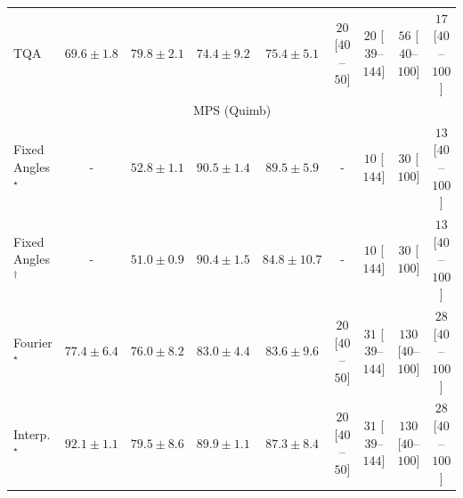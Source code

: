 \begin{tabular}{l|cccc|cccc|}
TQA & {\cellcolor[HTML]{95A8D0}} \color[HTML]{F1F1F1} $69.6\pm 1.8$ & {\cellcolor[HTML]{8A59A8}} \color[HTML]{F1F1F1} $79.8\pm 2.1$ & {\cellcolor[HTML]{8C84BD}} \color[HTML]{F1F1F1} $74.4\pm 9.2$ & {\cellcolor[HTML]{8C7CB9}} \color[HTML]{F1F1F1} $75.4\pm 5.1$ & {\cellcolor[HTML]{FFF4F0}} \color[HTML]{000000} $20$ [$40$--$50$] & {\cellcolor[HTML]{FFF4F0}} \color[HTML]{000000} $20$ [$39$--$144$] & {\cellcolor[HTML]{FEECE9}} \color[HTML]{000000} $56$ [$40$--$100$] & {\cellcolor[HTML]{FFF5F1}} \color[HTML]{000000} $17$ [$40$--$100$] \\
\cline{1-9}
\multicolumn{9}{c}{\rule{0pt}{8pt}MPS (Quimb)} \\
\midrule
Fixed Angles$^\star$ & {\cellcolor[HTML]{000000}} \color[HTML]{F1F1F1} {\cellcolor{white}} \color{black} - & {\cellcolor[HTML]{FFFCD8}} \color[HTML]{000000} $52.8\pm 1.1$ & {\cellcolor[HTML]{812D05}} \color[HTML]{F1F1F1} $90.5\pm 1.4$ & {\cellcolor[HTML]{8B3005}} \color[HTML]{F1F1F1} $89.5\pm 5.9$ & {\cellcolor[HTML]{000000}} \color[HTML]{F1F1F1} {\cellcolor{white}} \color{black} - & {\cellcolor[HTML]{FFF7F3}} \color[HTML]{000000} $10$ [$144$] & {\cellcolor[HTML]{FFF2EE}} \color[HTML]{000000} $30$ [$100$] & {\cellcolor[HTML]{FFF6F2}} \color[HTML]{000000} $13$ [$40$--$100$] \\
Fixed Angles$^\dagger$ & {\cellcolor[HTML]{000000}} \color[HTML]{F1F1F1} {\cellcolor{white}} \color{black} - & {\cellcolor[HTML]{FFFFE5}} \color[HTML]{000000} $51.0\pm 0.9$ & {\cellcolor[HTML]{832D05}} \color[HTML]{F1F1F1} $90.4\pm 1.5$ & {\cellcolor[HTML]{B84203}} \color[HTML]{F1F1F1} $84.8\pm 10.7$ & {\cellcolor[HTML]{000000}} \color[HTML]{F1F1F1} {\cellcolor{white}} \color{black} - & {\cellcolor[HTML]{FFF7F3}} \color[HTML]{000000} $10$ [$144$] & {\cellcolor[HTML]{FFF2EE}} \color[HTML]{000000} $30$ [$100$] & {\cellcolor[HTML]{FFF6F2}} \color[HTML]{000000} $13$ [$40$--$100$] \\
Fourier$^\star$ & {\cellcolor[HTML]{EC7014}} \color[HTML]{F1F1F1} $77.4\pm 6.4$ & {\cellcolor[HTML]{F17C1A}} \color[HTML]{F1F1F1} $76.0\pm 8.2$ & {\cellcolor[HTML]{C94B02}} \color[HTML]{F1F1F1} $83.0\pm 4.4$ & {\cellcolor[HTML]{C44802}} \color[HTML]{F1F1F1} $83.6\pm 9.6$ & {\cellcolor[HTML]{FFF4F0}} \color[HTML]{000000} $20$ [$40$--$50$] & {\cellcolor[HTML]{FFF2EE}} \color[HTML]{000000} $31$ [$39$--$144$] & {\cellcolor[HTML]{FDDBD7}} \color[HTML]{000000} $130$ [$40$--$100$] & {\cellcolor[HTML]{FFF3EF}} \color[HTML]{000000} $28$ [$40$--$100$] \\
Interp.$^\star$ & {\cellcolor[HTML]{712806}} \color[HTML]{F1F1F1} $92.1\pm 1.1$ & {\cellcolor[HTML]{DF620D}} \color[HTML]{F1F1F1} $79.5\pm 8.6$ & {\cellcolor[HTML]{882F05}} \color[HTML]{F1F1F1} $89.9\pm 1.1$ & {\cellcolor[HTML]{A03704}} \color[HTML]{F1F1F1} $87.3\pm 8.4$ & {\cellcolor[HTML]{FFF4F0}} \color[HTML]{000000} $20$ [$40$--$50$] & {\cellcolor[HTML]{FFF2EE}} \color[HTML]{000000} $31$ [$39$--$144$] & {\cellcolor[HTML]{FDDBD7}} \color[HTML]{000000} $130$ [$40$--$100$] & {\cellcolor[HTML]{FFF3EF}} \color[HTML]{000000} $28$ [$40$--$100$] \\

\end{tabular}
